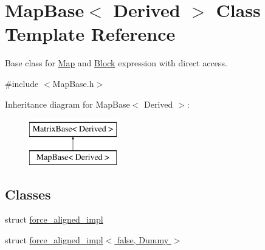 \hypertarget{class_map_base}{\section{Map\-Base$<$ Derived $>$ Class Template Reference}
\label{class_map_base}
}


Base class for \hyperlink{class_map}{Map} and \hyperlink{class_block}{Block} expression with direct access.  




{\ttfamily \#include $<$Map\-Base.\-h$>$}

Inheritance diagram for Map\-Base$<$ Derived $>$\-:\begin{figure}[H]
\begin{center}
\leavevmode
\includegraphics[height=2.000000cm]{class_map_base}
\end{center}
\end{figure}
\subsection*{Classes}
\begin{DoxyCompactItemize}
\item 
struct \hyperlink{struct_map_base_1_1force__aligned__impl}{force\-\_\-aligned\-\_\-impl}
\item 
struct \hyperlink{struct_map_base_1_1force__aligned__impl_3_01false_00_01_dummy_01_4}{force\-\_\-aligned\-\_\-impl$<$ false, Dummy $>$}
\end{DoxyCompactItemize}
